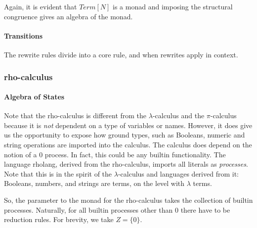 Again, it is evident that $Term[N]$ is a monad and imposing the structural congruence gives an algebra of the monad.

\paragraph{Transitions}
The rewrite rules divide into a core rule, and when rewrites apply in
context.

\subsubsection{rho-calculus}

\paragraph{Algebra of States}
Note that the rho-calculus is different from the $\lambda$-calculus and the $\pi$-calculus because it is \emph{not} dependent on a type of variables or names. However, it does give us the opportunity to expose how ground types, such as Booleans, numeric and string operations are imported into the calculus. The calculus does depend on the notion of a $0$ process. In fact, this could be any builtin functionality. The language rholang, derived from the rho-calculus, imports all literals as \emph{processes}. Note that this is in the spirit of the $\lambda$-calculus and languages derived from it: Booleans, numbers, and strings are terms, on the level with $\lambda$ terms.

So, the parameter to the monad for the rho-calculus takes the collection of builtin processes. Naturally, for all builtin processes other than $0$ there have to be reduction rules. For brevity, we take $Z = \{0\}$.

